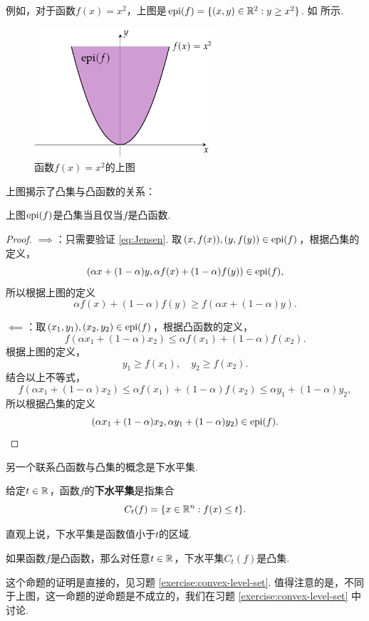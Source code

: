 例如，对于函数$f(x)=x^2$，上图是$\operatorname*{epi}(f)=\{(x,y)\in\mathbb{R}^2:y\geq x^2\}$. 如 所示.

\begin{figure}[ht]
    \centering
    \includegraphics[width=0.6\textwidth]{figures/convex-anlaysis/epigraph.pdf}
    \caption{函数$f(x)=x^2$的上图}
    \label{fig:epigraph}
\end{figure}

上图揭示了凸集与凸函数的关系：
\begin{theorem}\label{thm:convex-epi}
    上图$\operatorname*{epi}(f)$是凸集当且仅当$f$是凸函数.
\end{theorem}

\begin{proof}
$\implies$：只需要验证 \eqref{eq:Jensen}. 取$(x,f(x)),(y,f(y))\in\operatorname*{epi}(f)$，根据凸集的定义，
\[(\alpha x+(1-\alpha)y,\alpha f(x)+(1-\alpha)f(y))\in\operatorname*{epi}(f),\]
所以根据上图的定义
\[\alpha f(x)+(1-\alpha)f(y)\geq f(\alpha x+(1-\alpha)y).\]

$\impliedby$：取$(x_1,y_1),(x_2,y_2)\in\operatorname*{epi}(f)$，根据凸函数的定义，
\[f(\alpha x_1+(1-\alpha) x_2)\leq\alpha f(x_1)+(1-\alpha)f(x_2).\]
根据上图的定义，
\[y_1\geq f(x_1),\quad y_2\geq f(x_2).\]
结合以上不等式，
\[f(\alpha x_1+(1-\alpha) x_2)\leq\alpha f(x_1)+(1-\alpha)f(x_2)\leq\alpha y_1+(1-\alpha) y_2,\]
所以根据凸集的定义
\[(\alpha x_1+(1-\alpha) x_2,\alpha y_1+(1-\alpha) y_2)\in\operatorname*{epi}(f).\]
\end{proof}

另一个联系凸函数与凸集的概念是下水平集. 
\begin{definition}[下水平集]
    给定$t\in\mathbb{R}$，函数$f$的\textbf{下水平集}是指集合
    \[C_t(f)=\{x\in\mathbb{R}^n:f(x)\leq t\}.\]
\end{definition}
直观上说，下水平集是函数值小于$t$的区域.

\begin{proposition}\label{prop:level-set}
    如果函数$f$是凸函数，那么对任意$t\in\mathbb{R}$，下水平集$C_t(f)$是凸集.
\end{proposition}
这个命题的证明是直接的，见习题 \ref{exercise:convex-level-set}. 值得注意的是，不同于上图，这一命题的逆命题是不成立的，我们在习题 \ref{exercise:convex-level-set} 中讨论. 

